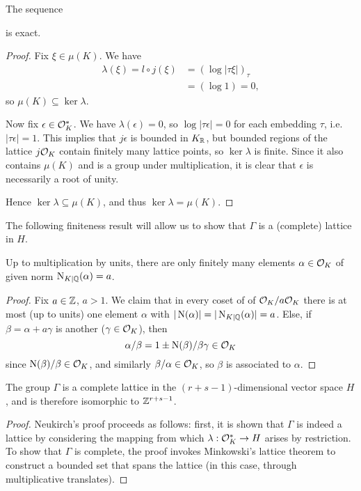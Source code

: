 \begin{prop}[Neukirch 7.1]
The sequence
\begin{center}
\end{center}
is exact.
\end{prop}
\begin{proof}
	Fix $\xi\in\mu(K)$. We have
	\begin{align*}
		\lambda(\xi) = l\circ j(\xi) &= \left(\log|\tau\xi|\right)_\tau\\
			&= (\log 1) = 0,
	\end{align*}
	so $\mu(K)\subseteq\ker\lambda$.

	Now fix $\epsilon\in\mathcal{O}^*_K$. We have $\lambda(\epsilon)=0$, so $\log|\tau\epsilon|=0$ for each embedding $\tau$, i.e. $|\tau\epsilon|=1$. This implies that $j\epsilon$ is bounded in $K_{\mathbb{R}}$, but bounded regions of the lattice $j\mathcal{O}_K$ contain finitely many lattice points, so $\ker\lambda$ is finite. Since it also contains $\mu(K)$ and is a group under multiplication, it is clear that $\epsilon$ is necessarily a root of unity.

	Hence $\ker\lambda\subseteq\mu(K)$, and thus $\ker\lambda=\mu(K)$.
\end{proof}

The following finiteness result will allow us to show that $\Gamma$ is a (complete) lattice in $H$.

\begin{lem}[Neukirch 7.2]
	Up to multiplication by units, there are only finitely many elements $\alpha\in\mathcal{O}_K$ of given norm $\operatorname{N}_{K\mid\mathbb{Q}}(\alpha)=a$.
\end{lem}
\begin{proof}
	Fix $a\in\mathbb{Z}$, $a>1$. We claim that in every coset of of $\mathcal{O}_K/a\mathcal{O}_K$ there is at most (up to units) one element $\alpha$ with $|\operatorname{N}(\alpha)|=|\operatorname{N}_{K\mid\mathbb{Q}}(\alpha)|=a$. Else, if $\beta=\alpha+a\gamma$ is another ($\gamma\in\mathcal{O}_K$), then
	\[
		\alpha/\beta = 1 \pm \operatorname{N}(\beta)/\beta \gamma \in \mathcal{O}_K
	\]
	since $\operatorname{N}(\beta)/\beta \in \mathcal{O}_K$, and similarly $\beta/\alpha\in\mathcal{O}_K$, so $\beta$ is associated to $\alpha$.
\end{proof}

\begin{thm}[Neukirch 7.3]
	The group $\Gamma$ is a complete lattice in the $(r+s-1)$-dimensional vector space $H$, and is therefore isomorphic to $\mathbb{Z}^{r+s-1}$.
\end{thm}
\begin{proof}
	Neukirch's proof proceeds as follows: first, it is shown that $\Gamma$ is indeed a lattice by considering the mapping from which $\lambda:\mathcal{O}_K^*\to H$ arises by restriction. To show that $\Gamma$ is complete, the proof invokes Minkowski's lattice theorem to construct a bounded set that spans the lattice (in this case, through multiplicative translates).
\end{proof}

